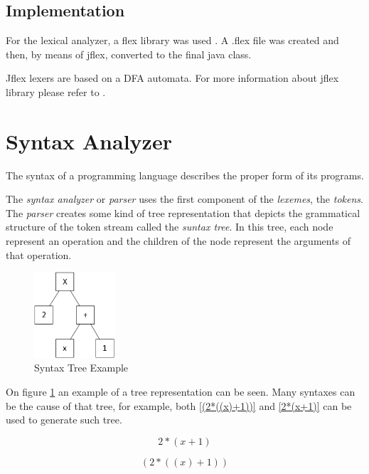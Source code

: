 \documentclass[conference]{IEEEtran}
\begin{document}
\subsection{Implementation}

For the lexical analyzer, a flex library was used \cite{JFLEX}. A .flex file was created and then, by means of jflex, converted to the final java class.

Jflex lexers are based on a DFA automata. For more information about jflex library please refer to \cite{JFLEX_MANUAL}. 

\section{Syntax Analyzer}

The syntax of a programming language describes the proper form of its programs.

The \textit{syntax analyzer} or \textit{parser} uses the first component of the \textit{lexemes}, the \textit{tokens}. The \textit{parser} creates some kind of tree representation that depicts the grammatical structure of the token stream called the \textit{suntax tree}. In this tree, each node represent an operation and the children of the node represent the arguments of that operation. 

\begin{figure}[H]
	\centering
	\includegraphics[width=3cm]{images/syntax_tree.png}
	\caption{Syntax Tree Example}
	\label{fig_syntax_tree_example}
\end{figure}

On figure \ref{fig_syntax_tree_example} an example of a tree representation can be seen. Many syntaxes can be the cause of that tree, for example, both \ref{(2*((x)+1))} and \ref{2*(x+1)} can be used to generate such tree.

\begin{equation}
2*(x+1)
\label{2*(x+1)}
\end{equation}

\begin{equation}
(2*((x)+1))
\label{(2*((x)+1))}
\end{equation}
\end{document}

